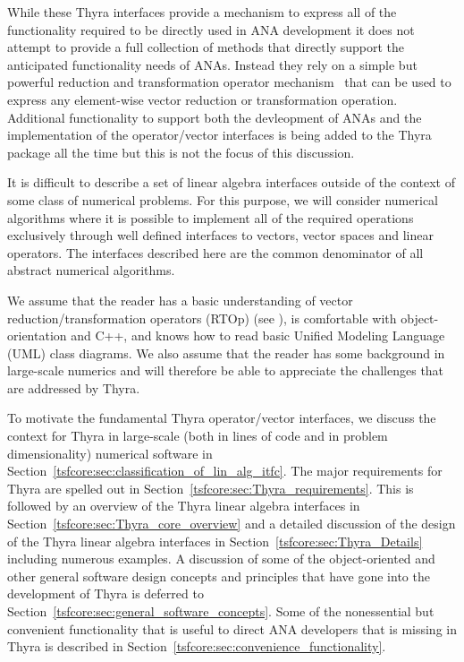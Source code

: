 \documentclass[pdf,ps2pdf,11pt]{SANDreport}
\begin{document}
While these Thyra interfaces provide a mechanism to express all of the
functionality required to be directly used in ANA development it does not
attempt to provide a full collection of methods that directly support the
anticipated functionality needs of ANAs.  Instead they rely on a simple but
powerful reduction and transformation operator mechanism~\cite{ref:rtop_toms}
that can be used to express any element-wise vector reduction or
transformation operation.  Additional functionality to support both the
devleopment of ANAs and the implementation of the operator/vector interfaces
is being added to the Thyra package all the time but this is not the focus of
this discussion.

It is difficult to describe a set of linear algebra interfaces outside
of the context of some class of numerical problems.  For this purpose,
we will consider numerical algorithms where it is possible to
implement all of the required operations exclusively through well
defined interfaces to vectors, vector spaces and linear operators.
The interfaces described here are the common denominator of all
abstract numerical algorithms.

We assume that the reader has a basic understanding of vector
reduction/transformation operators (RTOp) (see
{}\cite{ref:rtop_toms}), is comfortable with object-orientation
{}\cite{ref:gama_et_al_1995} and C++, and knows how to read basic
Unified Modeling Language (UML) {}\cite{ref:uml_distilled_2nd_ed}
class diagrams.  We also assume that the reader has some background in
large-scale numerics and will therefore be able to appreciate the
challenges that are addressed by Thyra.

To motivate the fundamental Thyra operator/vector interfaces, we discuss the
context for Thyra in large-scale (both in lines of code and in problem
dimensionality) numerical software in
Section~\ref{tsfcore:sec:classification_of_lin_alg_itfc}.  The major
requirements for Thyra are spelled out in
Section~\ref{tsfcore:sec:Thyra_requirements}.  This is followed by an overview
of the Thyra linear algebra interfaces in
Section~\ref{tsfcore:sec:Thyra_core_overview} and a detailed discussion of the
design of the Thyra linear algebra interfaces in
Section~\ref{tsfcore:sec:Thyra_Details} including numerous examples.  A
discussion of some of the object-oriented and other general software design
concepts and principles that have gone into the development of Thyra is
deferred to Section~\ref{tsfcore:sec:general_software_concepts}.  Some of the
nonessential but convenient functionality that is useful to direct ANA
developers that is missing in Thyra is described in
Section~\ref{tsfcore:sec:convenience_functionality}.
\end{document}
